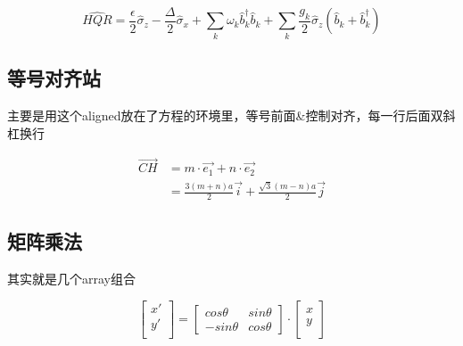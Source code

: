 \documentclass[AutoFakeBold]{LUTThesis}
\begin{document}
\begin{equation}
    \hat{HQR}=\frac{\epsilon}{2}\hat{\sigma}_{z}-\frac{\Delta}{2}\hat{\sigma}_{x}+\sum_{k}\omega_{k}\hat{b}_{k}^{\dagger}\hat{b}_{k}+\sum_{k}\frac{g_{k}}{2}\hat{\sigma}_{z}(\hat{b}_{k}+\hat{b}_{k}^{\dagger})\label{eq:sbm}
\end{equation}



\subsection{等号对齐站} %
\label{sub:等号对齐站}

主要是用这个aligned放在了方程的环境里，等号前面\&控制对齐，每一行后面双斜杠换行

\begin{equation}
    \begin{aligned}
        \vec{CH} & = m\cdot \vec{e_1} + n\cdot \vec{e_2}                          \\
                 & = \frac{3(m+n)a}{2} \vec{i} + \frac{\sqrt{3}(m-n)a}{2} \vec{j}
    \end{aligned}
    \label{ch}
\end{equation}


\subsection{矩阵乘法} %
\label{sub:矩阵乘法}

其实就是几个array组合

\begin{equation}
    \left[
        \begin{array}{c}
            x' \\
            y' \\
        \end{array}
        \right]=
    \left[
        \begin{array}{cc}
            cos \theta   & sin \theta \\
            - sin \theta & cos \theta
        \end{array}
        \right]
    \cdot
    \left[
        \begin{array}{c}
            x \\
            y \\
        \end{array}
        \right]
\end{equation}
\end{document}

